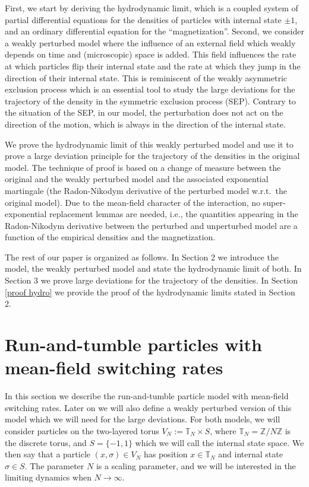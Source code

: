 \documentclass[11pt]{article}
\numberwithin{equation}{section}
\theoremstyle{definition}
\theoremstyle{plain}
\begin{document}
First, we start by deriving the hydrodynamic limit, which is a coupled system of partial differential equations for the densities of particles
with internal state $\pm 1$, and an ordinary differential equation for the ``magnetization''.
Second, we consider a weakly perturbed model where the influence of an external field which weakly depends on time and (microscopic) space is added. This field influences the rate at which particles flip their internal state and the rate at which they jump in the direction of their internal state.
This is reminiscent of the weakly asymmetric exclusion process \cite{KOV} which is an essential tool to study the large deviations for the trajectory of the density in the symmetric exclusion process (SEP). Contrary to the situation of the SEP, in our model, the perturbation does not act on the direction of the motion, which is always in the direction of the internal state.

We prove the hydrodynamic limit of this weakly perturbed model and use it to prove a large deviation principle for the trajectory of the densities in the original model. The technique of proof is based on a change of measure between the original and the weakly perturbed model and the associated  exponential martingale (the Radon-Nikodym derivative of the perturbed model w.r.t.\ the original model). Due to the mean-field character of the interaction, no super-exponential replacement lemmas are needed, i.e., the quantities appearing in the Radon-Nikodym derivative between the perturbed and unperturbed model are a function of the empirical densities and the magnetization.

The rest of our paper is organized as follows. In Section 2 we introduce the model, the weakly perturbed model and state the hydrodynamic limit of both. In Section 3 we prove large deviations for the trajectory of the densities. In Section \ref{proof hydro} we provide the proof of the hydrodynamic limits stated in Section 2.



\section{Run-and-tumble particles with mean-field switching rates}
In this section we describe the run-and-tumble particle model with mean-field switching rates. Later on we will also define a weakly perturbed version of this model which we will need for the large deviations. For both models, we will consider particles on the two-layered torus $V_N := \mathbb{T}_N \times S$, where $\mathbb{T}_N = \mathbb{Z}/N\mathbb{Z}$ is the discrete torus, and $S= \{-1,1\}$ which we will call the internal state space. We then say that a particle $(x,\sigma) \in V_N$ has position $x\in \mathbb{T}_N$ and internal state $\sigma \in S$. The parameter $N$ is a scaling parameter, and we will be interested in the limiting dynamics when $N\to\infty$.
\end{document}
